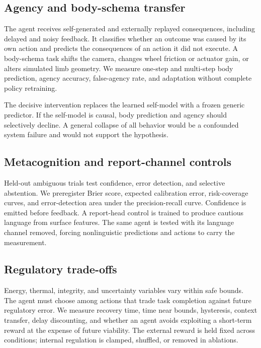 \documentclass[conference]{IEEEtran}
\begin{document}
\subsection{Agency and body-schema transfer}

The agent receives self-generated and externally replayed consequences, including delayed and noisy feedback. It classifies whether an outcome was caused by its own action and predicts the consequences of an action it did not execute. A body-schema task shifts the camera, changes wheel friction or actuator gain, or alters simulated limb geometry. We measure one-step and multi-step body prediction, agency accuracy, false-agency rate, and adaptation without complete policy retraining.

The decisive intervention replaces the learned self-model with a frozen generic predictor. If the self-model is causal, body prediction and agency should selectively decline. A general collapse of all behavior would be a confounded system failure and would not support the hypothesis.

\subsection{Metacognition and report-channel controls}

Held-out ambiguous trials test confidence, error detection, and selective abstention. We preregister Brier score, expected calibration error, risk-coverage curves, and error-detection area under the precision-recall curve. Confidence is emitted before feedback. A report-head control is trained to produce cautious language from surface features. The same agent is tested with its language channel removed, forcing nonlinguistic predictions and actions to carry the measurement.

\subsection{Regulatory trade-offs}

Energy, thermal, integrity, and uncertainty variables vary within safe bounds. The agent must choose among actions that trade task completion against future regulatory error. We measure recovery time, time near bounds, hysteresis, context transfer, delay discounting, and whether an agent avoids exploiting a short-term reward at the expense of future viability. The external reward is held fixed across conditions; internal regulation is clamped, shuffled, or removed in ablations.
\end{document}

